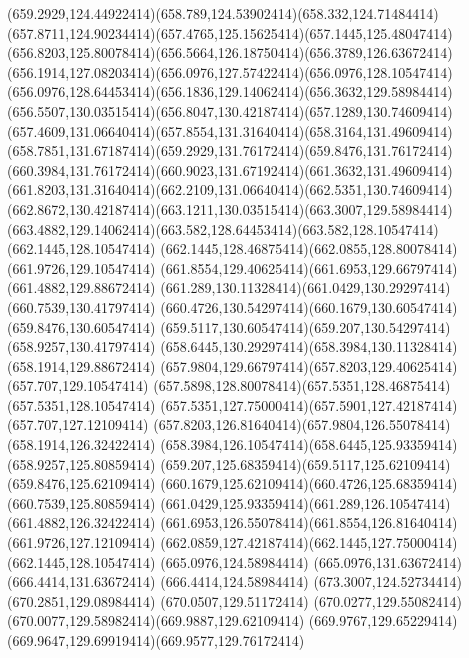 {{	\curveto(659.2929,124.44922414)(658.789,124.53902414)(658.332,124.71484414)
	\curveto(657.8711,124.90234414)(657.4765,125.15625414)(657.1445,125.48047414)
	\curveto(656.8203,125.80078414)(656.5664,126.18750414)(656.3789,126.63672414)
	\curveto(656.1914,127.08203414)(656.0976,127.57422414)(656.0976,128.10547414)
	\curveto(656.0976,128.64453414)(656.1836,129.14062414)(656.3632,129.58984414)
	\curveto(656.5507,130.03515414)(656.8047,130.42187414)(657.1289,130.74609414)
	\curveto(657.4609,131.06640414)(657.8554,131.31640414)(658.3164,131.49609414)
	\curveto(658.7851,131.67187414)(659.2929,131.76172414)(659.8476,131.76172414)
	\curveto(660.3984,131.76172414)(660.9023,131.67192414)(661.3632,131.49609414)
	\curveto(661.8203,131.31640414)(662.2109,131.06640414)(662.5351,130.74609414)
	\curveto(662.8672,130.42187414)(663.1211,130.03515414)(663.3007,129.58984414)
	\curveto(663.4882,129.14062414)(663.582,128.64453414)(663.582,128.10547414)
	\closepath
	\moveto(662.1445,128.10547414)
	\curveto(662.1445,128.46875414)(662.0855,128.80078414)(661.9726,129.10547414)
	\curveto(661.8554,129.40625414)(661.6953,129.66797414)(661.4882,129.88672414)
	\curveto(661.289,130.11328414)(661.0429,130.29297414)(660.7539,130.41797414)
	\curveto(660.4726,130.54297414)(660.1679,130.60547414)(659.8476,130.60547414)
	\curveto(659.5117,130.60547414)(659.207,130.54297414)(658.9257,130.41797414)
	\curveto(658.6445,130.29297414)(658.3984,130.11328414)(658.1914,129.88672414)
	\curveto(657.9804,129.66797414)(657.8203,129.40625414)(657.707,129.10547414)
	\curveto(657.5898,128.80078414)(657.5351,128.46875414)(657.5351,128.10547414)
	\curveto(657.5351,127.75000414)(657.5901,127.42187414)(657.707,127.12109414)
	\curveto(657.8203,126.81640414)(657.9804,126.55078414)(658.1914,126.32422414)
	\curveto(658.3984,126.10547414)(658.6445,125.93359414)(658.9257,125.80859414)
	\curveto(659.207,125.68359414)(659.5117,125.62109414)(659.8476,125.62109414)
	\curveto(660.1679,125.62109414)(660.4726,125.68359414)(660.7539,125.80859414)
	\curveto(661.0429,125.93359414)(661.289,126.10547414)(661.4882,126.32422414)
	\curveto(661.6953,126.55078414)(661.8554,126.81640414)(661.9726,127.12109414)
	\curveto(662.0859,127.42187414)(662.1445,127.75000414)(662.1445,128.10547414)
	\closepath
	\moveto(665.0976,124.58984414)
	\lineto(665.0976,131.63672414)
	\lineto(666.4414,131.63672414)
	\lineto(666.4414,124.58984414)
	\closepath
	\moveto(673.3007,124.52734414)
	\lineto(670.2851,129.08984414)
	\lineto(670.0507,129.51172414)
	\curveto(670.0277,129.55082414)(670.0077,129.58982414)(669.9887,129.62109414)
	\curveto(669.9767,129.65229414)(669.9647,129.69919414)(669.9577,129.76172414)
}}
